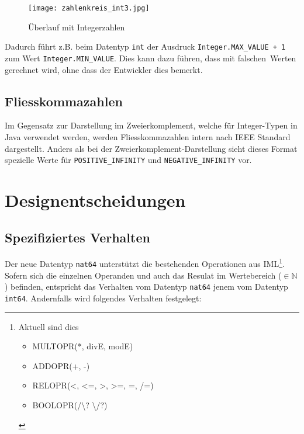 \documentclass[10pt, a4paper, twocolumn]{article} %
\begin{document}
\begin{figure}[H]
    \texttt{[image: zahlenkreis\_int3.jpg]} %
    \caption{Überlauf mit Integerzahlen } %
    \label{zahlenkreis} %
\end{figure}


Dadurch führt z.B. beim Datentyp \texttt{int} der Ausdruck \texttt{Integer.MAX\_VALUE + 1} zum Wert \texttt{Integer.MIN\_VALUE}.
Dies kann dazu führen, dass mit \glqq falschen\grqq \ Werten gerechnet wird, ohne dass der Entwickler dies bemerkt.

\subsection{Fliesskommazahlen}
Im Gegensatz zur Darstellung im Zweierkomplement, welche für Integer-Typen in Java verwendet werden, werden Fliesskommazahlen intern nach IEEE Standard dargestellt.
Anders als bei der Zweierkomplement-Darstellung sieht dieses Format spezielle Werte für \texttt{POSITIVE\_INFINITY} und \texttt{NEGATIVE\_INFINITY} vor.

\section{Designentscheidungen}
\subsection{Spezifiziertes Verhalten}
Der neue Datentyp \texttt{nat64} unterstützt die bestehenden Operationen aus IML\footnote{Aktuell sind dies \begin{itemize} \item MULTOPR(*, divE, modE) \item ADDOPR(+, -) \item RELOPR(<, <=, >, >=, =, /=) \item BOOLOPR(/\textbackslash? \textbackslash/?)\end{itemize}}.
Sofern sich die einzelnen Operanden und auch das Resulat im Wertebereich ($\in \mathbb{N}$) befinden, %
entspricht das Verhalten vom Datentyp \texttt{nat64} jenem vom Datentyp \texttt{int64}.
Andernfalls wird folgendes Verhalten festgelegt:
\end{document}
